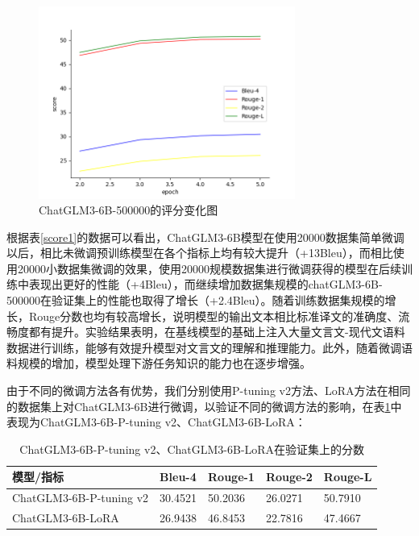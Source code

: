 \documentclass[
    decl-page,  %
    ,fontset = win, %
  ]{njuthesis}
\begin{document}
\begin{figure}[h]
  \centering
  \includegraphics[width=0.75\textwidth]{image/50w-score.png}
  \caption{ChatGLM3-6B-500000的评分变化图}
  \label{50w-score}
\end{figure}

根据表\ref{score1}的数据可以看出，ChatGLM3-6B模型在使用20000数据集简单微调以后，相比未微调预训练模型在各个指标上均有较大提升（+13Bleu），而相比使用20000小数据集微调的效果，使用20000规模数据集进行微调获得的模型在后续训练中表现出更好的性能（+4Bleu），而继续增加数据集规模的chatGLM3-6B-500000在验证集上的性能也取得了增长（+2.4Bleu）。随着训练数据集规模的增长，Rouge分数也均有较高增长，说明模型的输出文本相比标准译文的准确度、流畅度都有提升。实验结果表明，在基线模型的基础上注入大量文言文-现代文语料数据进行训练，能够有效提升模型对文言文的理解和推理能力。此外，随着微调语料规模的增加，模型处理下游任务知识的能力也在逐步增强。

由于不同的微调方法各有优势，我们分别使用P-tuning v2方法、LoRA方法在相同的数据集上对ChatGLM3-6B进行微调，以验证不同的微调方法的影响，在表\ref{pt-lora}中表现为ChatGLM3-6B-P-tuning v2、ChatGLM3-6B-LoRA：

\begin{table}[]
\renewcommand\arraystretch{1.5}
\caption{ChatGLM3-6B-P-tuning v2、ChatGLM3-6B-LoRA在验证集上的分数}
\label{pt-lora}
\begin{tabular}{|l|l|l|l|l|}
\hline
\textbf{模型/指标}          & \textbf{Bleu-4} & \textbf{Rouge-1} & \textbf{Rouge-2} & \textbf{Rouge-L} \\ \hline
ChatGLM3-6B-P-tuning v2 & 30.4521         & 50.2036          & 26.0271          & 50.7910           \\ \hline
ChatGLM3-6B-LoRA        & 26.9438         & 46.8453          & 22.7816          & 47.4667          \\ \hline
\end{tabular}
\end{table}
\end{document}
